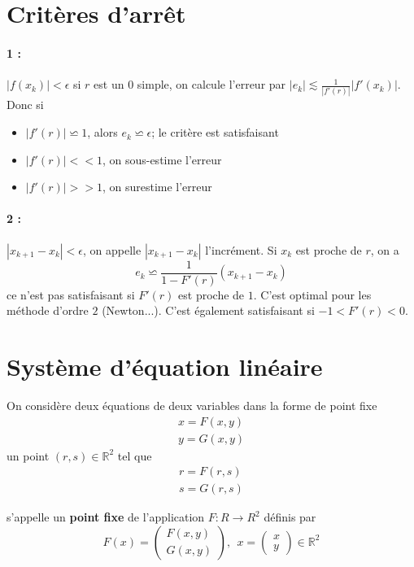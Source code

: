 \documentclass[a4paper,9pt]{extarticle}
\begin{document}
\begin{multicols*}{2}
\section{Critères d'arrêt}
\paragraph*{1 :} $|f(x_k)|<\epsilon$ si $r$ est un $0$ simple, on calcule l'erreur par $|e_k|\lesssim\frac{1}{|f'(r)|}|f'(x_k)|$. Donc si 
\begin{itemize}
    \item $|f'(r)| \backsimeq 1$, alors $e_k \backsimeq\epsilon$; le critère est satisfaisant
    \item $|f'(r)| << 1$, on sous-estime l'erreur
    \item $|f'(r)| >> 1$, on surestime l'erreur
\end{itemize}

\paragraph*{2 :} $|x_{k+1}-x_k| < \epsilon$, on appelle $|x_{k+1}-x_k|$ l'incrément. Si $x_k$ est proche de $r$, on a
$$
e_k \backsimeq \frac{1}{1-F'(r)}(x_{k+1}-x_k)
$$
ce n'est pas satisfaisant si $F'(r)$ est proche de $1$. C'est optimal pour les méthode d'ordre $2$ (Newton...). C'est également satisfaisant si $-1<F'(r) < 0$.

\section{Système d'équation linéaire}

On considère deux équations de deux variables dans la forme de point fixe
\begin{align*}
x=F(x,y)\\
y=G(x,y)
\end{align*}
un point $(r,s)\in \mathbb{R}^2$ tel que
\begin{align*}
r = F(r,s)\\
s = G(r,s)
\end{align*}

s'appelle un \textbf{point fixe} de l'application $F:R\rightarrow R^2$ définis par $$
F(x)=\begin{pmatrix} F(x,y)\\G(x,y)\end{pmatrix},\ \ x=\begin{pmatrix} x\\y\end{pmatrix} \in \mathbb{R}^2
$$


\end{multicols*}
\end{document}
